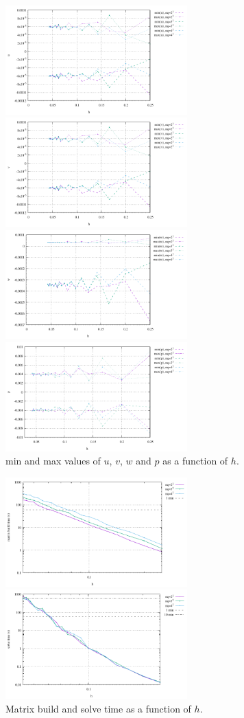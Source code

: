 \begin{center}
\includegraphics[width=7cm]{python_codes/fieldstone_82/results/sphere/u.pdf}
\includegraphics[width=7cm]{python_codes/fieldstone_82/results/sphere/v.pdf}\\
\includegraphics[width=7cm]{python_codes/fieldstone_82/results/sphere/w.pdf}
\includegraphics[width=7cm]{python_codes/fieldstone_82/results/sphere/p.pdf}\\
{\captionfont min and max values of $u$, $v$, $w$ and $p$ as a function of $h$.}
\end{center}

\begin{center}
\includegraphics[width=7cm]{python_codes/fieldstone_82/results/sphere/build.pdf}
\includegraphics[width=7cm]{python_codes/fieldstone_82/results/sphere/solve.pdf}\\
{\captionfont Matrix build and solve time as a function of $h$.}
\end{center}
